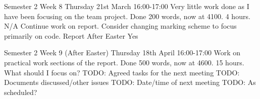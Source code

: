 \documentclass[../CHEFCookingHelper.tex]{subfiles}
\begin{document}
\logbookentry
{Semester 2 Week 8}
{Thursday 21st March 16:00-17:00}
{Very little work done as I have been focusing on the team project. Done 200 words, now at 4100.}
{4 hours.}
{N/A}
{Continue work on report. Consider changing marking scheme to focus primarily on code.}
{Report}
{After Easter}
{Yes}

\logbookentry
{Semester 2 Week 9 (After Easter)}
{Thursday 18th April 16:00-17:00}
{Work on practical work sections of the report. Done 500 words, now at 4600.}
{15 hours.}
{What should I focus on?}
{TODO: Agreed tasks for the next meeting}
{TODO: Documents discussed/other issues}
{TODO: Date/time of next meeting}
{TODO: As scheduled?}
\end{document}
